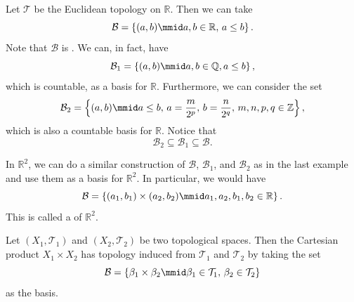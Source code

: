 \documentclass[notoc,notitlepage]{tufte-book}
\begin{document}
\begin{eg}\label{eg:basis_of_r_n}
  Let $\mathcal{T}$ be the Euclidean topology on $\mathbb{R}$.
  Then we can take
  \begin{equation*}
    \mathcal{B} = \left\{ (a, b) \mmid a, b \in \mathbb{R}, \, a \leq b \right\}.
  \end{equation*}
  Note that $\mathcal{B}$ is .
  We can, in fact, have
  \begin{equation*}
    \mathcal{B}_1 = \left\{ (a, b) \mmid a, b \in \mathbb{Q}, a \leq b \right\},
  \end{equation*}
  which is countable, as a basis for $\mathbb{R}$.
  Furthermore, we can consider the set
  \begin{equation*}
    \mathcal{B}_2 = \left\{ (a, b) \mmid a \leq b, \, a = \frac{m}{2^p}, \, b = \frac{n}{2^q}, \, m, n, p, q \in \mathbb{Z} \right\},
  \end{equation*}
  which is also a countable basis for $\mathbb{R}$.
  Notice that
  \begin{equation*}
    \mathcal{B}_2 \subseteq \mathcal{B}_1 \subseteq \mathcal{B}.
  \end{equation*}
\end{eg}

\begin{eg}
  In $\mathbb{R}^2$, we can do a similar construction of $\mathcal{B}$,
  $\mathcal{B}_1$, and $\mathcal{B}_2$ as in the last example and use
  them as a basis for $\mathbb{R}^2$. In particular, we would have
  \begin{equation*}
    \mathcal{B} = \left\{ (a_1, b_1) \times (a_2, b_2) \mmid a_1, a_2, b_1, b_2 \in \mathbb{R} \right\}.
  \end{equation*}
  This is called a  of $\mathbb{R}^2$.
\end{eg}

\begin{eg}
  Let $(X_1, \mathcal{T}_1)$ and $(X_2, \mathcal{T}_2)$ be two topological spaces.
  Then the Cartesian product $X_1 \times X_2$ has topology induced
  from $\mathcal{T}_1$ and $\mathcal{T}_2$ by taking the set
  \begin{equation*}
    \mathcal{B} = \left\{ \beta_1 \times \beta_2 \mmid \beta_1 \in \mathcal{T}_1, \, \beta_2 \in \mathcal{T}_2 \right\}
  \end{equation*}
  as the basis.
\end{eg}
\end{document}
